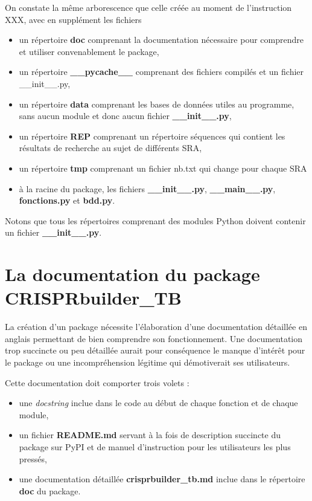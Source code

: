 \documentclass[twoside,a4paper,11pt,frenchb,openany]{report}
\begin{document}
On constate la même arborescence que celle créée au moment de l'instruction XXX, avec en supplément les fichiers 



\begin{itemize}
\item un répertoire \textbf{doc} comprenant la documentation nécessaire pour comprendre et utiliser convenablement le package,
\item un répertoire \textbf{\_\_pycache\_\_} comprenant des fichiers compilés et un fichier \_\_init\_\_.py,
\item un répertoire \textbf{data} comprenant les bases de données utiles au programme, sans aucun module et donc aucun fichier \textbf{\_\_init\_\_.py},
\item un répertoire \textbf{REP} comprenant un répertoire séquences qui contient les résultats de recherche au sujet de différents SRA,
\item un répertoire \textbf{tmp} comprenant un fichier nb.txt qui change pour chaque SRA
\item à la racine du package, les fichiers \textbf{\_\_init\_\_.py}, \textbf{\_\_main\_\_.py}, \textbf{fonctions.py} et \textbf{bdd.py}.
\end{itemize}

Notons que tous les répertoires comprenant des modules Python doivent contenir un fichier
\textbf{ \_\_init\_\_.py}.



\chapter{La documentation du package CRISPRbuilder\_TB}

La création d'un package nécessite l'élaboration d'une documentation détaillée en anglais permettant de bien comprendre son fonctionnement. Une documentation trop succincte ou peu détaillée aurait pour conséquence le manque d'intérêt pour le package ou une incompréhension légitime qui démotiverait ses utilisateurs.

Cette documentation doit comporter trois volets :
\begin{itemize}
\item une \textit{docstring} inclue dans le code au début de chaque fonction et de chaque module,
\item un fichier \textbf{README.md} servant à la fois de description succincte du package sur PyPI et de manuel d'instruction pour les utilisateurs les plus pressés,
\item une documentation détaillée \textbf{crisprbuilder\_tb.md} inclue dans le répertoire \textbf{doc} du package.
\end{itemize}   
\end{document}
